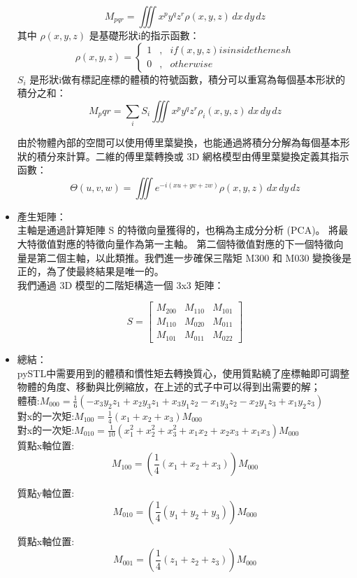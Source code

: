 \begin{itemize}
$$M_{pqr} = \iiint x^{p} y^{q} z^{r} \rho (x,y,z) \,dx\,dy\,dz$$
其中 $\rho (x,y,z)$ 是基礎形狀i的指示函數：\\
\begin{equation}
\label{eq6}
\rho (x,y,z) = \left\{
\begin{aligned}
1 & , & if (x,y,z) is inside the mesh\\
0 & , &              otherwise
\end{aligned}
\right.
\end{equation}
$S_i$ 是形狀i做有標記座標的體積的符號函數，積分可以重寫為每個基本形狀的積分之和：\\
$$M_pqr = \sum_{i} S_i \iiint x^{p} y^{q} z^{r} \rho_i (x,y,z) \,dx\,dy\,dz$$

由於物體內部的空間可以使用傅里葉變換，也能通過將積分分解為每個基本形狀的積分來計算。二維的傅里葉轉換或 3D 網格模型由傅里葉變換定義其指示函數：\\

$$ \Theta (u,v,w) = \iiint e^{-i (xu+yv+zw)} \rho (x,y,z) \,dx\,dy\,dz $$

\item 產生矩陣：\\
主軸是通過計算矩陣 S 的特徵向量獲得的，也稱為主成分分析 (PCA)。 將最大特徵值對應的特徵向量作為第一主軸。 第二個特徵值對應的下一個特徵向量是第二個主軸，以此類推。我們進一步確保三階矩 M300 和 M030 變換後是正的，為了使最終結果是唯一的。\\

我們通過 3D 模型的二階矩構造一個 3x3 矩陣：

\[ 
S=\begin{bmatrix} 
M_{200} & M_{110} & M_{101} \\
M_{110} & M_{020} & M_{011} \\
M_{101} & M_{011} & M_{022} 
\end{bmatrix}
\]

\item 總結：\\
pySTL中需要用到的體積和慣性矩去轉換質心，使用質點繞了座標軸即可調整物體的角度、移動與比例縮放，在上述的式子中可以得到出需要的解；\\

體積:$M_{000} = \frac{1}{6}(-x_3 y_2 z_1 + x_2 y_3 z_1 + x_3 y_1 z_2 - x_1 y_3 z_2 - x_2 y_1 z_3 + x_1 y_2 z_3) $\\

對x的一次矩:$M_{100} = \frac{1}{4}(x_1 + x_2 + x_3) M_{000} $\\

對x的一次矩:$M_{010} = \frac{1}{10}(x_1^{2} + x_2^{2} + x_3^{2} + x_1 x_2 + x_2 x_3 + x_1 x_3 ) M_{000} $\\

質點x軸位置:\\

$$M_{100} = (\frac{1}{4}(x_1 + x_2 + x_3)) M_{000}$$

質點y軸位置:\\

$$M_{010} = (\frac{1}{4}(y_1 + y_2 + y_3)) M_{000}$$

質點x軸位置:\\

$$M_{001} = (\frac{1}{4}(z_1 + z_2 + z_3)) M_{000}$$


\end{itemize}